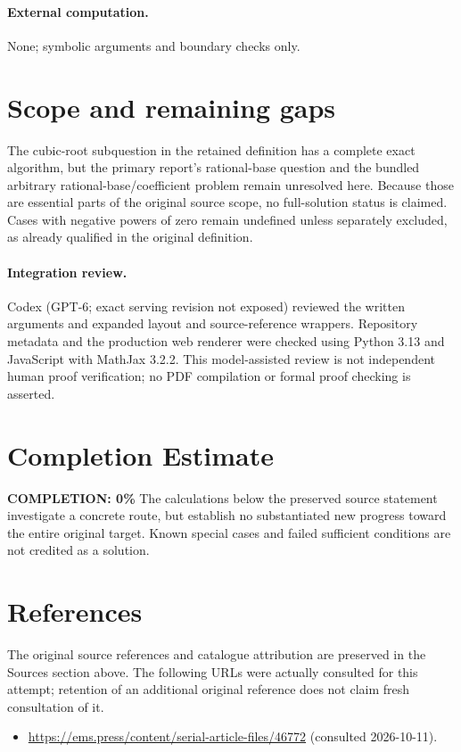 \documentclass[11pt]{article}
\begin{document}
\paragraph{External computation.} None; symbolic arguments and boundary checks only.
\section{Scope and remaining gaps}
The cubic-root subquestion in the retained definition has a complete exact algorithm, but the primary report's rational-base question and the bundled arbitrary rational-base/coefficient problem remain unresolved here. Because those are essential parts of the original source scope, no full-solution status is claimed. Cases with negative powers of zero remain undefined unless separately excluded, as already qualified in the original definition.
\paragraph{Integration review.} Codex (GPT-6; exact serving revision not exposed) reviewed the written arguments and expanded layout and source-reference wrappers. Repository metadata and the production web renderer were checked using Python 3.13 and JavaScript with MathJax 3.2.2. This model-assisted review is not independent human proof verification; no PDF compilation or formal proof checking is asserted.

\section{Completion Estimate}
\noindent\textbf{COMPLETION: 0\%}
The calculations below the preserved source statement investigate a concrete route,
but establish no substantiated new progress toward the entire original target.
Known special cases and failed sufficient conditions are not credited as a solution.
\section{References}
The original source references and catalogue attribution are preserved in the
Sources section above. The following URLs were actually consulted for this attempt;
retention of an additional original reference does not claim fresh consultation of it.
\begin{itemize}
\item \url{https://ems.press/content/serial-article-files/46772} (consulted 2026-10-11). 
\end{itemize}
\end{document}
